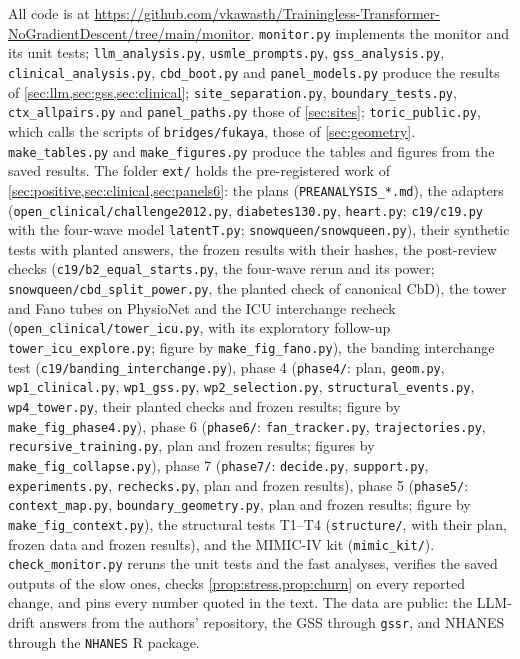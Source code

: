 \documentclass[11pt]{article}
\theoremstyle{definition}
\theoremstyle{remark}
\begin{document}
{\sloppy All code is at \url{https://github.com/vkawasth/Trainingless-Transformer-NoGradientDescent/tree/main/monitor}. \texttt{monitor.py} implements the
monitor and its unit tests; \texttt{llm\_analysis.py}, \texttt{usmle\_prompts.py}, \texttt{gss\_analysis.py}, \texttt{clinical\_analysis.py},
\texttt{cbd\_boot.py} and \texttt{panel\_models.py} produce the results of \cref{sec:llm,sec:gss,sec:clinical};
\texttt{site\_separation.py}, \texttt{boundary\_tests.py}, \texttt{ctx\_allpairs.py} and \texttt{panel\_paths.py} those of \cref{sec:sites};
\texttt{toric\_public.py}, which calls the scripts of \texttt{bridges/fukaya}, those of \cref{sec:geometry}. \texttt{make\_tables.py} and
\texttt{make\_figures.py} produce the tables and figures from the saved results. The folder \texttt{ext/} holds the pre-registered
work of \cref{sec:positive,sec:clinical,sec:panels6}: the plans (\texttt{PREANALYSIS\_*.md}), the adapters
(\texttt{open\_clinical/challenge2012.py}, \texttt{diabetes130.py}, \texttt{heart.py}; \texttt{c19/c19.py} with the four-wave model
\texttt{latentT.py}; \texttt{snowqueen/snowqueen.py}), their synthetic tests with planted answers, the frozen results with their hashes,
the post-review checks (\texttt{c19/b2\_equal\_starts.py}, the four-wave rerun and its power; \texttt{snowqueen/cbd\_split\_power.py},
the planted check of canonical CbD), the tower and Fano tubes on PhysioNet and the ICU interchange recheck (\texttt{open\_clinical/tower\_icu.py}, with its exploratory follow-up \texttt{tower\_icu\_explore.py}; figure by \texttt{make\_fig\_fano.py}), the banding interchange test (\texttt{c19/banding\_interchange.py}), phase 4 (\texttt{phase4/}: plan, \texttt{geom.py}, \texttt{wp1\_clinical.py}, \texttt{wp1\_gss.py}, \texttt{wp2\_selection.py}, \texttt{structural\_events.py}, \texttt{wp4\_tower.py}, their planted checks and frozen results; figure by \texttt{make\_fig\_phase4.py}), phase 6 (\texttt{phase6/}: \texttt{fan\_tracker.py}, \texttt{trajectories.py}, \texttt{recursive\_training.py}, plan and frozen results; figures by \texttt{make\_fig\_collapse.py}), phase 7 (\texttt{phase7/}: \texttt{decide.py}, \texttt{support.py}, \texttt{experiments.py}, \texttt{rechecks.py}, plan and frozen results), phase 5 (\texttt{phase5/}: \texttt{context\_map.py}, \texttt{boundary\_geometry.py}, plan and frozen results; figure by \texttt{make\_fig\_context.py}), the structural tests T1--T4 (\texttt{structure/}, with their plan, frozen data and frozen
results), and the MIMIC-IV kit (\texttt{mimic\_kit/}). \texttt{check\_monitor.py} reruns
the unit tests and the fast analyses, verifies the saved outputs of the slow ones, checks \cref{prop:stress,prop:churn} on every reported
change, and pins every number quoted in the text. The data are public: the LLM-drift answers from the authors' repository, the GSS through
\texttt{gssr}, and NHANES through the \texttt{NHANES} R package.\par}
\end{document}
